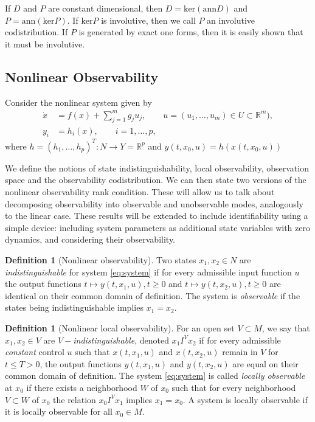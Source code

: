 \documentclass[psamsfonts]{amsart}
\theoremstyle{definition}
\newtheorem{defn}[thm]{Definition}
\theoremstyle{remark}
\newcommand*\R{\mathds{R}}
\numberwithin{equation}{section}
\begin{document}
If $D$ and $P$ are constant dimensional, then $D = \text{ker}( \text{ann} D)$ and $P = \text{ann}(\text{ker} P)$. If $\text{ker} P$ is involutive, then we call $P$ an involutive codistribution. If $P$ is generated by exact one forms, then it is easily shown that it must be involutive. 


\subsection{Nonlinear Observability}
Consider the nonlinear system given by 
\begin{equation}
    \begin{aligned}
        \dot x & = {} f(x) + \sum_{j = 1}^m g_j u_j, \qquad u = (u_1, \dots, u_m) \in U\subset \R^m), \\
        y_i & = {} h_i(x), \qquad i = 1, \dots, p,
    \end{aligned}\label{eq:system}
\end{equation}
where $h = (h_1, \dots, h_p)^T:N\rightarrow Y=\R^p$ and $y(t, x_0, u) = h(x(t, x_0, u))$

We define the notions of state indistinguishability, local observability, observation space and the observability codistribution. We can then state two versions of the nonlinear observability rank condition. These will allow us to talk about decomposing observability into observable and unobservable modes, analogously to the linear case. These results will be extended to include identifiability using a simple device: including system parameters as additional state variables with zero dynamics, and considering their observability. 

\begin{defn}[Nonlinear observability]
    Two states $x_1, x_2\in N$ are \textit{indistinguishable} for system \eqref{eq:system} if for every admissible input function $u$ the output functions $t\mapsto y(t, x_1, u), t\geq 0$ and $t\mapsto y(t, x_2, u), t\geq 0$ are identical on their common domain of definition. The system is \textit{observable} if the states being indistinguishable implies $x_1=x_2$. 
\end{defn}

\begin{defn}[Nonlinear local observability]
    For an open set $V\subset M$, we say that $x_1, x_2 \in V$ are \textit{$V-$indistinguishable}, denoted $x_1 I^V x_2$ if for every admissible \textit{constant} control $u$ such that $x(t, x_1, u)$ and $x(t, x_2, u)$ remain in $V$ for $t\leq T > 0$, the output functions $y(t, x_1, u)$ and $y(t, x_2, u)$ are equal on their common domain of definition. The system \eqref{eq:system} is called \textit{locally observable} at $x_0$ if there exists a neighborhood $W$ of $x_0$ such that for every neighborhood $V\subset W$ of $x_0$ the relation $x_0 I^V x_1$ implies $x_1 = x_0$. A system is locally observable if it is locally observable for all $x_0 \in M$. 
\end{defn}
\end{document}
